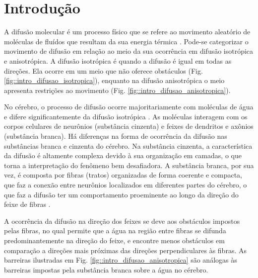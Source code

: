 \documentclass[
    12pt,                %
    oneside,            %
    a4paper,            %
    english,            %
    french,                %
    spanish,            %
    brazil                %
    ]{abntex2}
\begin{document}
\textual



\chapter{Introdução}
\label{sec:introducao}

A difusão molecular é um processo físico que se refere ao movimento aleatório de moléculas de fluídos que resultam da sua energia térmica \cite{lebihan2006}. 
Pode-se categorizar o movimento de difusão em relação ao meio da sua ocorrência em difusão isotrópica e anisotrópica. A difusão isotrópica é quando a difusão é igual em todas as direções. Ela ocorre em um meio que não oferece obstáculos (Fig. \ref{fig::intro_difusao_isotropica}), enquanto na difusão anisotrópica o meio apresenta restrições ao movimento (Fig. \ref{fig::intro_difusao_anisotropica}).

No cérebro, o processo de difusão ocorre majoritariamente com moléculas de água e difere significantemente da difusão isotrópica \cite{lebihan2006}. As moléculas interagem com os corpos celulares de neurônios (substância cinzenta) e feixes de dendritos e axônios (substância branca).
Há diferenças na forma de ocorrência da difusão nas substâncias branca e cinzenta do cérebro. Na substância cinzenta, a característica da difusão é altamente complexa devido à sua organização em camadas, o que torna a interpretação do fenômeno bem desafiadora. A substância branca, por sua vez, é composta por fibras (tratos) organizadas de forma coerente e compacta, que faz a conexão entre neurônios localizados em diferentes partes do cérebro, o que faz a difusão ter um comportamento proeminente ao longo da direção do feixe de fibras \cite{DTI_Handbook}.

A ocorrência da difusão na direção dos feixes se deve aos obstáculos impostos pelas fibras, no qual permite que a água na região entre fibras se difunda predominantemente na direção do feixe, e encontre menos obstáculos em comparação a direções mais próximas das direções perpendiculares às fibras. As barreiras ilustradas em Fig. \ref{fig::intro_difusao_anisotropica} são análogas 
às barreiras impostas pela substância branca sobre a água no cérebro.
\end{document}
